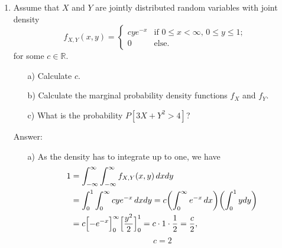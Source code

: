 \documentclass{article}
\begin{document}
\begin{enumerate}
\begin{itemize}
\end{itemize}


\newpage
\item

Assume that $X$ and $Y$ are jointly distributed random variables with joint density 
\[
f_{X,Y}(x,y) = \left\{ \begin{array}{ll} cy e^{-x} & \mbox{if } 0 \leq x < \infty, \, 0 \leq y \leq 1;\\ 0  & \mbox{else}.\end{array} \right.
\]
for some $c \in \mathbb{R}$.
\begin{itemize}
	\item[a)] Calculate $c$.
	\item[b)] Calculate the marginal probability density functions $f_X$ and $f_Y$.
	\item[c)] What is the probability $P[ 3X+ Y^2 > 4]$?
\end{itemize}

Answer:

\begin{itemize}
		\item[a)] As the density has to integrate up to one, we have
		\begin{align*}
		1 &= \int_{-\infty}^\infty \int_{-\infty}^\infty  f_{X,Y}(x,y) \, dxdy \\
		&= \int_0^1 \int_0^\infty  cy e^{-x} \, dxdy = c \biggl(\int_0^\infty e^{-x} \, dx \biggr)\biggl(\int_0^1  y dy \biggr)\\
		&= c \Bigl[-e^{-x}\Bigr]_0^\infty \Bigl[\frac{y^2}{2}\Bigr]_0^1 = c \cdot 1 \cdot \frac{1}{2} = \frac{c}{2},
		\end{align*}
		$$ \boxed{c=2}$$
		

\end{itemize}
\end{enumerate}
\end{document}
